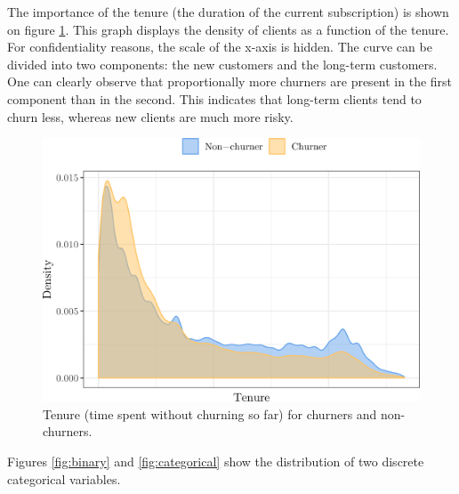 The importance of the tenure (the duration of the current subscription) is shown
on figure \ref{fig:tenure}. This graph displays the density of clients as a
function of the tenure. For confidentiality reasons, the scale of the x-axis is
hidden. The curve can be divided into two components: the new customers and the
long-term customers. One can clearly observe that proportionally more churners
are present in the first component than in the second. This indicates that
long-term clients tend to churn less, whereas new clients are much more risky.

\begin{figure}
    \centering
	\includegraphics[width=0.9\linewidth]{figures/tenure.png}
	\caption{Tenure (time spent without churning so far) for churners and
	non-churners.}
	\label{fig:tenure}
\end{figure}

Figures \ref{fig:binary} and \ref{fig:categorical} show the distribution of
two discrete categorical variables.

